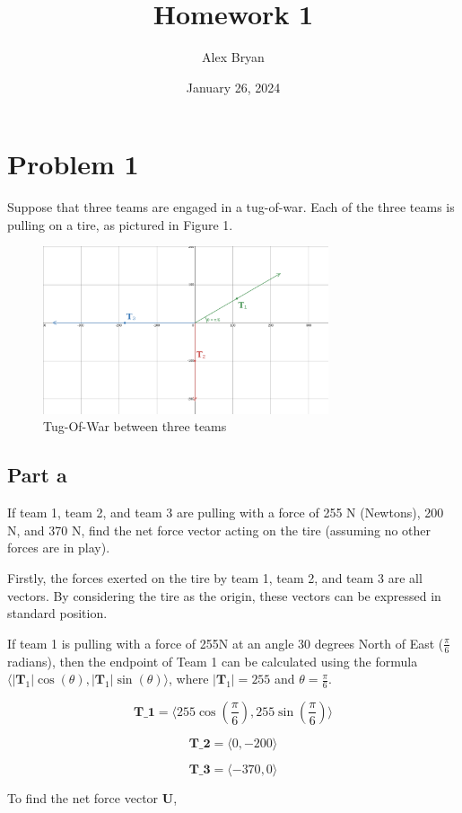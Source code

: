 \documentclass[12pt, letterpaper]{article}
\title{Homework 1}
\author{Alex Bryan}
\date{January 26, 2024}
\begin{document}
\maketitle

\section{Problem 1}

Suppose that three teams are engaged in a tug-of-war. Each of the three teams is pulling on a tire, as pictured in Figure 1.

\begin{figure}[hpt]
    \centering
    \includegraphics[width=0.75\textwidth]{tug}
    \caption{Tug-Of-War between three teams}\label{tug.png}
\end{figure}

\subsection{Part a}

If team 1, team 2, and team 3 are pulling with a force of 255 N (Newtons), 200 N, and 370
N, find the net force vector acting on the tire (assuming no other forces are in play).

Firstly, the forces exerted on the tire by team 1, team 2, and team 3 are all vectors. By considering the tire as the origin, these vectors can be expressed in standard position.

If team 1 is pulling with a force of 255N at an angle 30 degrees North of East (\( \frac{\pi}{6} \) radians), then the endpoint of Team 1 can be calculated using the formula
\( \langle |\textbf{T}_1|\cos(\theta), |\textbf{T}_1|\sin(\theta) \rangle \), where \( |\textbf{T}_1| = 255 \) and \( \theta = \frac{\pi}{6} \).


\[ \textbf{T_{1}} = \langle 255\cos(\frac{\pi}{6}), 255\sin(\frac{\pi}{6}) \rangle \] 

\newline

\[ \textbf{T_{2}} = \langle 0, -200 \rangle \] 

\newline

\[ \textbf{T_{3}} = \langle -370, 0 \rangle \] 

\newline

To find the net force vector \textbf{U},
\end{document}
